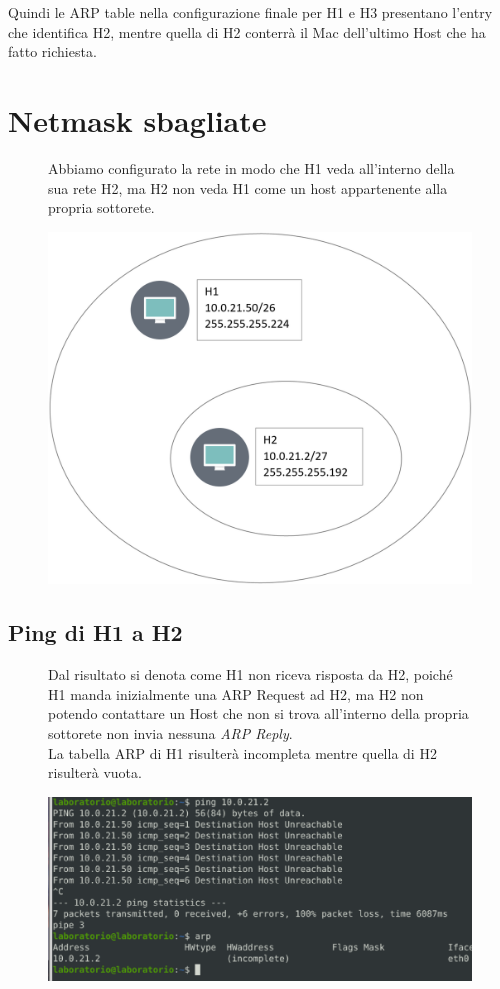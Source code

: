 \documentclass{article}
\begin{document}
Quindi le ARP table nella configurazione finale per H1 e H3 presentano l'entry che identifica H2, mentre quella di H2 conterrà il Mac dell’ultimo Host che ha fatto richiesta.

\section{Netmask sbagliate}
\begin{figure}[!htb]
    \begin{minipage}{0.48\textwidth}
        Abbiamo configurato la rete in modo che H1 veda all’interno della sua rete H2, ma H2 non veda H1 come un host appartenente alla propria sottorete.
    \end{minipage}\hfill
    \begin{minipage}{0.48\textwidth}
        \centering
        \includegraphics[width=0.7\linewidth]{es3.png}
    \end{minipage}
 \end{figure}


\subsection{Ping di H1 a H2}
\begin{figure}[!htb]
    \begin{minipage}{0.5\textwidth}
      Dal risultato si denota come H1 non riceva risposta da H2, poiché H1 manda inizialmente una ARP Request ad H2, ma H2 non potendo contattare un Host che non si trova all’interno della propria sottorete non invia nessuna \textit{ARP Reply}.
      \\La tabella ARP di H1 risulterà incompleta mentre quella di H2 risulterà vuota.
    \end{minipage}\hfill
    \begin{minipage}{0.5\textwidth}
      \includegraphics[width=0.8\linewidth,right]{es3hostUnreach.png}
    \end{minipage}
 \end{figure}
\end{document}
